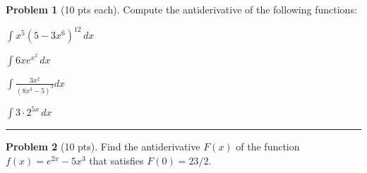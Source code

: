 \documentclass[12pt]{article}
\theoremstyle{definition}
\newtheorem{problem}{Problem}
\begin{document}
\bigskip
\begin{problem}[10 pts each] 
Compute the antiderivative of the following functions:
\item $\displaystyle{\int x^5 (5 - 3x^6)^{12}\, dx}$
\vspace{3.5cm}
\item $\displaystyle{\int  6x e^{x^2} \, dx}$
\vspace{3.5cm}
\item $\displaystyle{\int \frac{3x^2}{(8x^3-5)^3} dx}$
\vspace{3.5cm}
\item $\displaystyle{\int 3 \cdot 2^{5x}\, dx}$
\vspace{2.5cm}
\end{problem}
\hrule

\begin{problem}[10 pts]
Find the antiderivative $F(x)$ of the function $f(x) = e^{2x}  - 5x^3$ that satisfies $F(0)=23/2$.
\end{problem}
\end{document}
